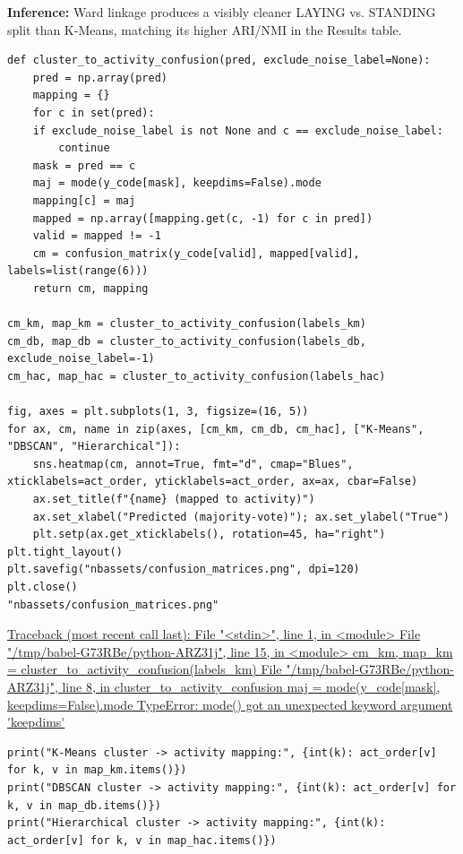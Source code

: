 \documentclass[12pt,a4paper]{article}
\begin{document}
\url{}

\textbf{Inference:} Ward linkage produces a visibly cleaner LAYING vs. STANDING
split than K-Means, matching its higher ARI/NMI in the Results table.

\begin{verbatim}
def cluster_to_activity_confusion(pred, exclude_noise_label=None):
    pred = np.array(pred)
    mapping = {}
    for c in set(pred):
	if exclude_noise_label is not None and c == exclude_noise_label:
	    continue
	mask = pred == c
	maj = mode(y_code[mask], keepdims=False).mode
	mapping[c] = maj
    mapped = np.array([mapping.get(c, -1) for c in pred])
    valid = mapped != -1
    cm = confusion_matrix(y_code[valid], mapped[valid], labels=list(range(6)))
    return cm, mapping

cm_km, map_km = cluster_to_activity_confusion(labels_km)
cm_db, map_db = cluster_to_activity_confusion(labels_db, exclude_noise_label=-1)
cm_hac, map_hac = cluster_to_activity_confusion(labels_hac)

fig, axes = plt.subplots(1, 3, figsize=(16, 5))
for ax, cm, name in zip(axes, [cm_km, cm_db, cm_hac], ["K-Means", "DBSCAN", "Hierarchical"]):
    sns.heatmap(cm, annot=True, fmt="d", cmap="Blues", xticklabels=act_order, yticklabels=act_order, ax=ax, cbar=False)
    ax.set_title(f"{name} (mapped to activity)")
    ax.set_xlabel("Predicted (majority-vote)"); ax.set_ylabel("True")
    plt.setp(ax.get_xticklabels(), rotation=45, ha="right")
plt.tight_layout()
plt.savefig("nbassets/confusion_matrices.png", dpi=120)
plt.close()
"nbassets/confusion_matrices.png"
\end{verbatim}

\url{Traceback (most recent call last): File "<stdin>", line 1, in <module> File "/tmp/babel-G73RBe/python-ARZ31j", line 15, in <module> cm\_km, map\_km = cluster\_to\_activity\_confusion(labels\_km) File "/tmp/babel-G73RBe/python-ARZ31j", line 8, in cluster\_to\_activity\_confusion maj = mode(y\_code[mask], keepdims=False).mode TypeError: mode() got an unexpected keyword argument 'keepdims'}

\begin{verbatim}
print("K-Means cluster -> activity mapping:", {int(k): act_order[v] for k, v in map_km.items()})
print("DBSCAN cluster -> activity mapping:", {int(k): act_order[v] for k, v in map_db.items()})
print("Hierarchical cluster -> activity mapping:", {int(k): act_order[v] for k, v in map_hac.items()})
\end{verbatim}
\end{document}
